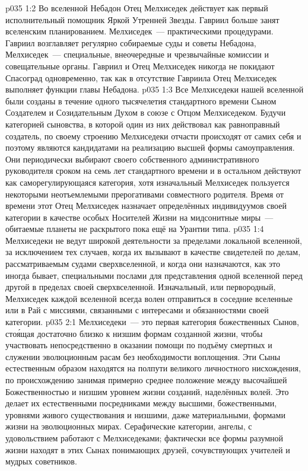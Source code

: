 \vs p035 1:2 Во вселенной Небадон Отец Мелхиседек действует как первый исполнительный помощник Яркой Утренней Звезды. Гавриил больше занят вселенским планированием. Мелхиседек~--- практическими процедурами. Гавриил возглавляет регулярно собираемые суды и советы Небадона, Мелхиседек~--- специальные, внеочередные и чрезвычайные комиссии и совещательные органы. Гавриил и Отец Мелхиседек никогда не покидают Спасоград одновременно, так как в отсутствие Гавриила Отец Мелхиседек выполняет функции главы Небадона.
\vs p035 1:3 Все Мелхиседеки нашей вселенной были созданы в течение одного тысячелетия стандартного времени Сыном Создателем и Созидательным Духом в союзе с Отцом Мелхиседеком. Будучи категорией сыновства, в которой один из них действовал как равноправный создатель, по своему строению Мелхиседеки отчасти происходят от самих себя и поэтому являются кандидатами на реализацию высшей формы самоуправления. Они периодически выбирают своего собственного административного руководителя сроком на семь лет стандартного времени и в остальном действуют как саморегулирующаяся категория, хотя изначальный Мелхиседек пользуется некоторыми неотъемлемыми прерогативами совместного родителя. Время от времени этот Отец Мелхиседек назначает определённых индивидуумов своей категории в качестве особых Носителей Жизни на мидсонитные миры~--- обитаемые планеты не раскрытого пока ещё на Урантии типа.
\vs p035 1:4 Мелхиседеки не ведут широкой деятельности за пределами локальной вселенной, за исключением тех случаев, когда их вызывают в качестве свидетелей по делам, рассматриваемым судами сверхвселенной, и когда они назначаются, как это иногда бывает, специальными послами для представления одной вселенной перед другой в пределах своей сверхвселенной. Изначальный, или первородный, Мелхиседек каждой вселенной всегда волен отправиться в соседние вселенные или в Рай с миссиями, связанными с интересами и обязанностями своей категории.
\vs p035 2:1 Мелхиседеки~--- это первая категория божественных Сынов, сто\'ящая достаточно близко к низшим формам созданной жизни, чтобы участвовать непосредственно в оказании помощи по подъёму смертных и служении эволюционным расам без необходимости воплощения. Эти Сыны естественным образом находятся на полпути великого личностного нисхождения, по происхождению занимая примерно среднее положение между высочайшей Божественностью и низшим уровнем жизни созданий, наделённых волей. Это делает их естественными посредниками между высшими, божественными, уровнями живого существования и низшими, даже материальными, формами жизни на эволюционных мирах. Серафические категории, ангелы, с удовольствием работают с Мелхиседеками; фактически все формы разумной жизни находят в этих Сынах понимающих друзей, сочувствующих учителей и мудрых советников.
